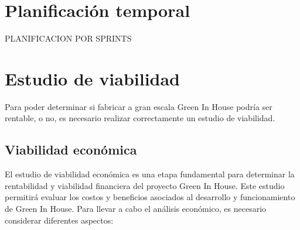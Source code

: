 \section{Planificación temporal}
PLANIFICACION POR SPRINTS

\section{Estudio de viabilidad}
Para poder determinar si fabricar a gran escala Green In House podría ser rentable, o no, es necesario realizar correctamente un estudio de viabilidad.
    \subsection{Viabilidad económica}
    El estudio de viabilidad económica es una etapa fundamental para determinar la rentabilidad y viabilidad financiera del proyecto Green In House. Este estudio permitirá evaluar los costos y beneficios asociados al desarrollo y funcionamiento de Green In House.
    Para llevar a cabo el análisis económico, es necesario considerar diferentes aspectos:
